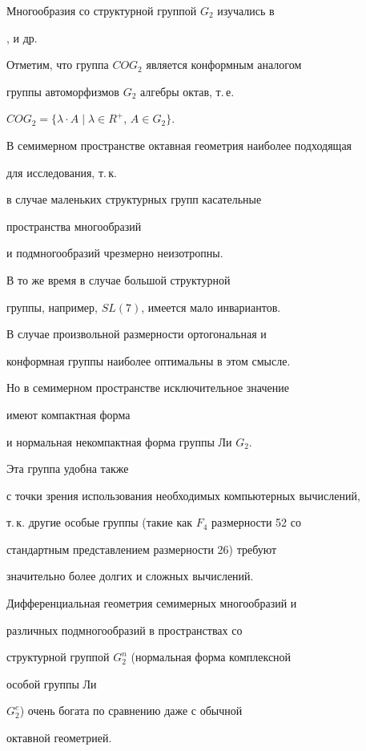 Многообразия со структурной группой $G_2$ изучались в


\cite{6}, \cite{5} и др.


Отметим, что группа $COG_2$ является конформным аналогом


группы автоморфизмов $G_2$ алгебры октав, т.\,е.


$COG_2=\{\lambda \cdot A \mid \lambda\in R^+$, $A\in G_2\}$.


В семимерном пространстве октавная геометрия наиболее подходящая


для исследования, т.\,к.


в случае маленьких структурных групп касательные


пространства многообразий


и подмногообразий чрезмерно неизотропны.


В то же время в случае большой структурной


группы, например, $SL(7)$, имеется мало инвариантов.


В случае произвольной размерности ортогональная и


конформная группы наиболее оптимальны в этом смысле.


Но в семимерном пространстве исключительное значение


имеют компактная форма


и нормальная некомпактная форма группы Ли $G_2.$


Эта группа удобна также


с точки зрения использования необходимых компьютерных вычислений,


т.\,к. другие особые группы (такие как $F_4$ размерности 52 со


стандартным представлением размерности 26) требуют


значительно более долгих и сложных вычислений.





Дифференциальная геометрия семимерных многообразий и


различных подмногообразий в пространствах со


структурной группой $G_2^n$ (нормальная форма комплексной


особой группы Ли


$G_2^c$) очень богата по сравнению даже с обычной


октавной геометрией.





